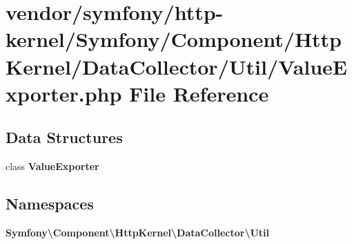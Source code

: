 \section{vendor/symfony/http-\/kernel/\+Symfony/\+Component/\+Http\+Kernel/\+Data\+Collector/\+Util/\+Value\+Exporter.php File Reference}
\label{_value_exporter_8php}
\subsection*{Data Structures}
\begin{DoxyCompactItemize}
\item 
class {\bf Value\+Exporter}
\end{DoxyCompactItemize}
\subsection*{Namespaces}
\begin{DoxyCompactItemize}
\item 
 {\bf Symfony\textbackslash{}\+Component\textbackslash{}\+Http\+Kernel\textbackslash{}\+Data\+Collector\textbackslash{}\+Util}
\end{DoxyCompactItemize}
